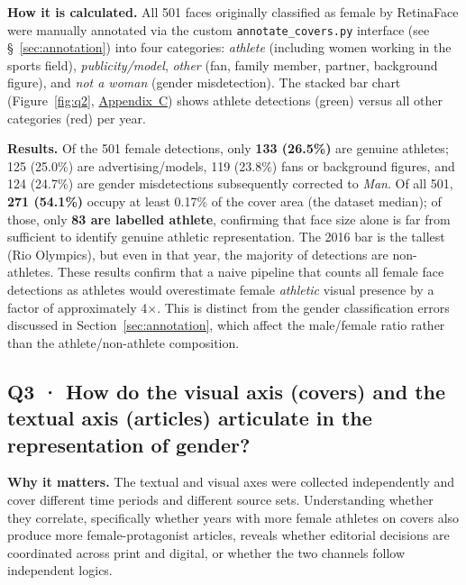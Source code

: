 \documentclass[11pt,a4paper]{article}
\begin{document}
\textbf{How it is calculated.} All 501 faces originally classified as female by RetinaFace were manually annotated via the custom \texttt{annotate\_covers.py} interface (see §~\ref{sec:annotation}) into four categories: \textit{athlete} (including women working in the sports field), \textit{publicity/model}, \textit{other} (fan, family member, partner, background figure), and \textit{not a woman} (gender misdetection). The stacked bar chart (Figure~\ref{fig:q2}, \hyperref[app:figures]{Appendix~C}) shows athlete detections (green) versus all other categories (red) per year.

\textbf{Results.} Of the 501 female detections, only \textbf{133 (26.5\%)} are genuine athletes; 125 (25.0\%) are advertising/models, 119 (23.8\%) fans or background figures, and 124 (24.7\%) are gender misdetections subsequently corrected to \textit{Man}. Of all 501, \textbf{271 (54.1\%)} occupy at least 0.17\% of the cover area (the dataset median); of those, only \textbf{83 are labelled athlete}, confirming that face size alone is far from sufficient to identify genuine athletic representation. The 2016 bar is the tallest (Rio Olympics), but even in that year, the majority of detections are non-athletes. These results confirm that a naive pipeline that counts all female face detections as athletes would overestimate female \textit{athletic} visual presence by a factor of approximately 4$\times$. This is distinct from the gender classification errors discussed in Section~\ref{sec:annotation}, which affect the male/female ratio rather than the athlete/non-athlete composition.

\subsection[Q3 · Visual axis vs.\ textual axis]{Q3 · How do the visual axis (covers) and the textual axis (articles) articulate in the representation of gender?}

\textbf{Why it matters.} The textual and visual axes were collected independently and cover different time periods and different source sets. Understanding whether they correlate, specifically whether years with more female athletes on covers also produce more female-protagonist articles, reveals whether editorial decisions are coordinated across print and digital, or whether the two channels follow independent logics.
\end{document}

